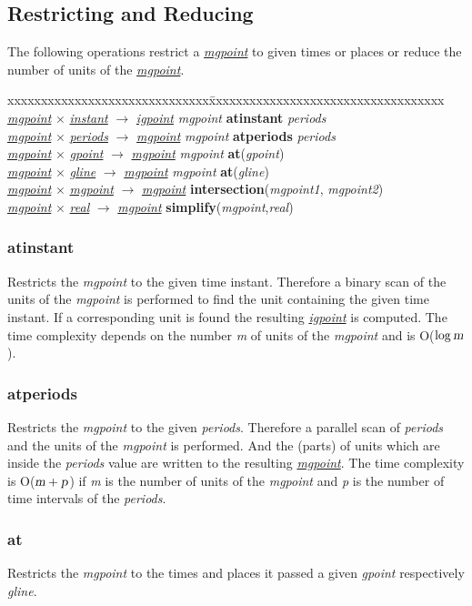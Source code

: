 \documentclass[a4paper]{article}
\newcommand{\op}[1]{\textbf{#1}}
\newcommand{\var}[1]{\textsl{#1}}
\newcommand{\dt}[1]{\textsl{\underline{#1}}}
\begin{document}
\subsection{Restricting and Reducing}
The following operations restrict a \dt{mgpoint} to given times or places or reduce the number of units of the \dt{mgpoint}.
\begin{tabbing}
xxxxxxxxxxxxxxxxxxxxxxxxxxxxxx\=xxxxxxxxxxxxxxxxxxxxxxxxxxxxxxxxxxx\kill
\dt{mgpoint} $\times$ \dt{instant} $\rightarrow$ \dt{igpoint} \> \var{mgpoint} \op{atinstant} \var{periods}\\
\dt{mgpoint} $\times$ \dt{periods} $\rightarrow$ \dt{mgpoint} \> \var{mgpoint} \op{atperiods} \var{periods} \\
\dt{mgpoint} $\times$ \dt{gpoint} $\rightarrow$ \dt{mgpoint} \> \var{mgpoint} \op{at}(\var{gpoint})\\
\dt{mgpoint} $\times$ \dt{gline} $\rightarrow$ \dt{mgpoint} \> \var{mgpoint} \op{at}(\var{gline})\\
\dt{mgpoint} $\times$ \dt{mgpoint}  $\rightarrow$  \dt{mgpoint} \> \op{intersection}(\var{mgpoint1}, \var{mgpoint2})\\
\dt{mgpoint} $\times$ \dt{real} $\rightarrow$ \dt{mgpoint} \> \op{simplify}(\var{mgpoint},\var{real})\\
\end{tabbing}
\subsubsection{\op{atinstant}}
Restricts the \var{mgpoint} to the given time instant. Therefore a binary scan of the units of the \var{mgpoint} is performed to find the unit containing the given time instant. If a corresponding unit is found the resulting  \dt{igpoint} is computed. The time complexity depends on the number \var{m} of units of the \var{mgpoint} and is O($\log \var{m}$).
\subsubsection{\op{atperiods}}
Restricts the \var{mgpoint} to the given \var{periods}. Therefore a parallel scan of \var{periods} and the units of the \var{mgpoint} is performed. And the (parts) of units which are inside the \var{periods} value are written to the resulting \dt{mgpoint}. The time complexity is O($\var{m} + \var{p}$) if \var{m} is the number of units of the \var{mgpoint} and \var{p} is the number of time intervals of the \var{periods}.
\subsubsection{\op{at}}
Restricts the \var{mgpoint} to the times and places it passed a given \var{gpoint} respectively \var{gline}.
\end{document}
